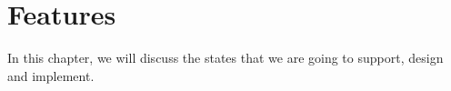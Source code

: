 \chapter{Features}
In this chapter, we will discuss  the states that we are going to support, design and implement.






